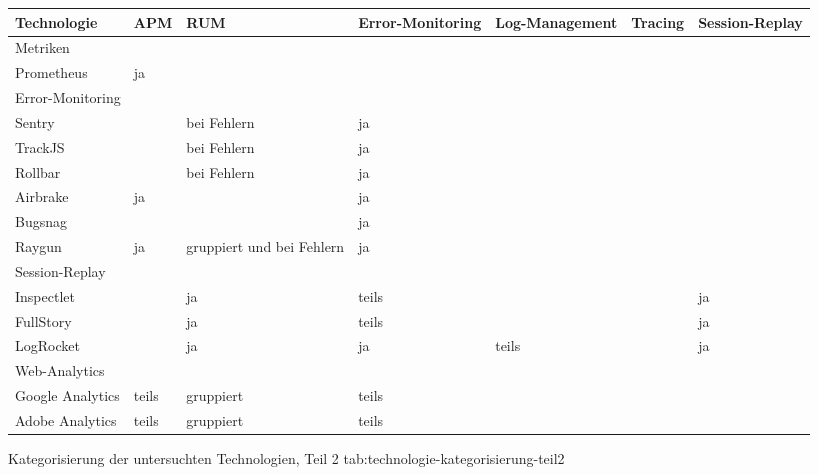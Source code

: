 %
{
\begin{tabular}{|p{2.25cm}|p{1.5cm}|p{2.0cm}|p{3.0cm}|p{3.0cm}|p{1.5cm}|p{2.5cm}|}
\hline
Technologie & APM & RUM & Error-Mo\-ni\-tor\-ing & Log-Management & Tracing & Session-Replay \\
\hline
\hline
\multicolumn{7}{|p{15.75cm}|}{Metriken} \\
\hline
Prometheus & ja &  &  &  &  &  \\
\hline
\hline
\multicolumn{7}{|p{15.75cm}|}{Error-Monitoring} \\
\hline
Sentry &  & bei \mbox{Fehlern} & ja &  &  &  \\
\hline
TrackJS &  & bei \mbox{Fehlern} & ja &  &  &  \\
\hline
Rollbar &  & bei \mbox{Fehlern} & ja &  &  &  \\
\hline
Airbrake & ja &  & ja &  &  &  \\
\hline
Bugsnag &  &  & ja &  &  &  \\
\hline
Raygun & ja & gruppiert und bei \mbox{Fehlern} & ja &  &  &  \\
\hline
\hline
\multicolumn{7}{|p{15.75cm}|}{Session-Replay} \\
\hline
Inspectlet &  & ja & teils &  &  & ja \\
\hline
FullStory &  & ja & teils &  &  & ja \\
\hline
LogRocket &  & ja & ja & teils &  & ja \\
\hline
\hline
\multicolumn{7}{|p{15.75cm}|}{Web-Analytics} \\
\hline
Google Analytics & teils & gruppiert & teils &  &  &  \\
\hline
Adobe Analytics & teils & gruppiert & teils &  &  &  \\
\hline
\end{tabular}
}
{Kategorisierung der untersuchten Technologien, Teil 2}
{tab:technologie-kategorisierung-teil2}